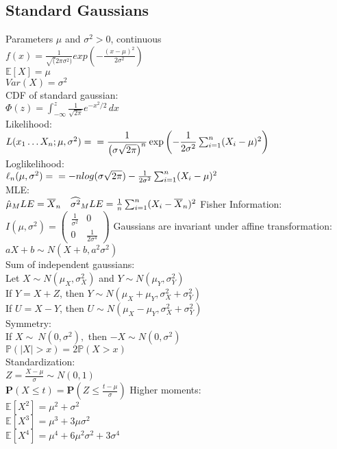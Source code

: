 \subsection*{Standard Gaussians}
Parameters $\mu$ and $\sigma^2 >0$, continuous\\
$f(x)= \frac{1}{\sqrt(2 \pi \sigma^2)} exp(-\frac{(x-\mu)^2}{2\sigma^2})$ \\
$\mathbb{E}[X]=\mu$ \\
$Var(X)=\sigma^2$\\
CDF of standard gaussian:\\
$\Phi (z) = \int _{-\infty }^ z \frac{1}{\sqrt{2 \pi }} e^{-x^2/2} \,  dx$\\
Likelihood:\\
$L(x_1\dots X_n;\mu,\sigma^2)=\\
= \dfrac{1}{\left(\sigma\sqrt{2\pi}\right)^n}\exp{\left(-\dfrac{1}{2\sigma^2}\sum_{i=1}^n (X_i-\mu)^2 \right)}$\\
Loglikelihood:\\
$\ell_n (\mu,\sigma^2)= \\
= -n log(\sigma\sqrt{2\pi})-\frac{1}{2\sigma^2}\sum_{i=1}^n (X_i-\mu)^2 $ \\
MLE:\\
$\hat\mu_MLE = \bar X_ n\\
\quad \widehat{\sigma ^2}_MLE = \frac{1}{n} \sum _{i=1}^{n} (X_ i - \bar X_ n)^2$
Fisher Information:\\
$I(\mu , \sigma ^2) = \begin{pmatrix}  \frac{1}{\sigma ^2} &  0 \\ 0 &  \frac{1}{2 \sigma ^4} \end{pmatrix}$
Gaussians are invariant under affine transformation:\\
$aX+b \sim N(X+b,a^2\sigma^2)$\\
Sum of independent gaussians:\\
Let $X {\sim} N(\mu_X,\sigma_X^2)$ and $Y {\sim} N(\mu_Y,\sigma_Y^2)$\\
If $Y = X + Z$, then $Y \sim N(\mu_X + \mu_Y, \sigma_X^2 + \sigma_Y^2)$\\
If $U = X - Y$, then $U \sim N(\mu_X - \mu_Y,\sigma_X^2 + \sigma_Y^2)$\\
Symmetry:\\
If $X \sim\ N(0,\sigma^2),$ then $-X \sim N(0,\sigma^2)$\\
$\mathbb{P}(|X|>x) = 2\mathbb{P}(X>x)$\\
Standardization:\\
$Z= \frac{X-\mu}{\sigma} \sim N(0,1)$\\
$\mathbf{P}\left(X\leq t\right) = \displaystyle \mathbf{P}\left(Z\leq \frac{t-\mu}{\sigma}\right)$
Higher moments:\\
$\mathbb{E}[X^2] = \mu^2 + \sigma^2$\\
$\mathbb{E}[X^3] = \mu^3 + 3\mu\sigma^2$\\
$\mathbb{E}[X^4] = \mu^4 + 6\mu^2\sigma^2 +3\sigma^4$\\
